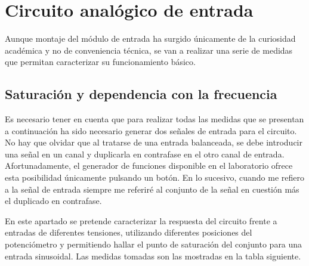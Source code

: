 \section{Circuito analógico de entrada\label{testcircuito}}

Aunque montaje del módulo de entrada ha surgido únicamente de la curiosidad académica y no de conveniencia técnica, se van a realizar una serie de medidas que permitan caracterizar su funcionamiento básico.

\subsection{Saturación y dependencia con la frecuencia}
Es necesario tener en cuenta que para realizar todas las medidas que se presentan a continuación ha sido necesario generar dos señales de entrada para el circuito. No hay que olvidar que al tratarse de una entrada balanceada, se debe introducir una señal en un canal y duplicarla en contrafase en el otro canal de entrada. Afortunadamente, el generador de funciones disponible en el laboratorio ofrece esta posibilidad únicamente pulsando un botón. En lo sucesivo, cuando me refiero a la señal de entrada siempre me referiré al conjunto de la señal en cuestión más el duplicado en contrafase.

En este apartado se pretende caracterizar la respuesta del circuito frente a entradas de diferentes tensiones, utilizando diferentes posiciones del potenciómetro y permitiendo hallar el punto de saturación del conjunto para una entrada sinusoidal. Las medidas tomadas son las mostradas en la tabla siguiente.\\

